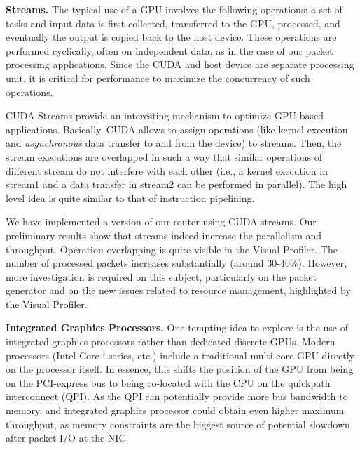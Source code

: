 \medskip \noindent \textbf{Streams.} The typical use of a GPU involves the following operations: a set of tasks and input data is first collected, transferred to the GPU, processed, and eventually the output is copied back to the host device. These operations are performed cyclically, often on independent data, as in the case of our packet processing applications. Since the CUDA and host device are separate processing unit, it is critical for performance to maximize the concurrency of such operations.

CUDA Streams provide an interesting mechanism to optimize GPU-based applications. Basically, CUDA allows to assign operations (like kernel execution and \emph{asynchronous} data transfer to and from the device) to streams. Then, the stream executions are overlapped in such a way that similar operations of different stream do not interfere with each other (i.e., a kernel execution in stream1 and a data transfer in stream2 can be performed in parallel). The high level idea is quite similar to that of instruction pipelining.

We have implemented a version of our router using CUDA streams. Our preliminary results show that streams indeed increase the parallelism and throughput. Operation overlapping is quite visible in the Visual Profiler. The number of processed packets increases substantially (around 30-40\%). However, more investigation is required on this subject, particularly on the packet generator and on the new issues related to resource management, highlighted by the Visual Profiler.


\medskip \noindent \textbf{Integrated Graphics Processors.} One tempting idea
to explore is the use of integrated graphics processors rather than dedicated
discrete GPUs. Modern processors (Intel Core i-series, etc.) include a
traditional multi-core GPU directly on the processor itself. In essence, this
shifts the position of the GPU from being on the PCI-express bus to being
co-located with the CPU on the quickpath interconnect (QPI). As the QPI can
potentially provide more bus bandwidth to memory, and integrated graphics
processor could obtain even higher maximum throughput, as memory constraints
are the biggest source of potential slowdown after packet I/O at the NIC.
